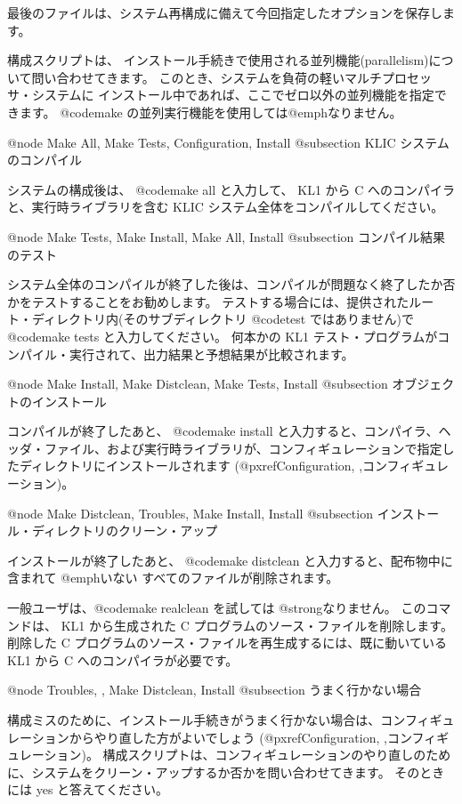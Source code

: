{{{{最後のファイルは、システム再構成に備えて今回指定したオプションを保存します。

構成スクリプトは、
インストール手続きで使用される並列機能(parallelism)について問い合わせてきます。
このとき、システムを負荷の軽いマルチプロセッサ・システムに
インストール中であれば、ここでゼロ以外の並列機能を指定できます。
 @code{make} の並列実行機能を使用しては@emph{なりません}。

@node Make All, Make Tests, Configuration, Install
@subsection KLIC システムのコンパイル

システムの構成後は、 @code{make all} と入力して、 KL1 から C へのコンパイラと、実行時ライブラリを含む KLIC システム全体をコンパイルしてください。

@node Make Tests, Make Install, Make All, Install
@subsection コンパイル結果のテスト

システム全体のコンパイルが終了した後は、コンパイルが問題なく終了したか否かをテストすることをお勧めします。
テストする場合には、提供されたルート・ディレクトリ内(そのサブディレクトリ @code{test} ではありません)で @code{make tests} と入力してください。
何本かの KL1 テスト・プログラムがコンパイル・実行されて、出力結果と予想結果が比較されます。

@node Make Install, Make Distclean, Make Tests, Install
@subsection オブジェクトのインストール

コンパイルが終了したあと、 @code{make install} と入力すると、コンパイラ、ヘッダ・ファイル、および実行時ライブラリが、コンフィギュレーションで指定したディレクトリにインストールされます
(@pxref{Configuration, ,コンフィギュレーション})。

@node Make Distclean, Troubles, Make Install, Install
@subsection インストール・ディレクトリのクリーン・アップ

インストールが終了したあと、 @code{make distclean} と入力すると、配布物中に含まれて @emph{いない} すべてのファイルが削除されます。

一般ユーザは、@code{make realclean} を試しては @strong{なりません}。
このコマンドは、 KL1 から生成された C プログラムのソース・ファイルを削除します。
削除した C プログラムのソース・ファイルを再生成するには、既に動いている KL1 から C へのコンパイラが必要です。

@node Troubles,  , Make Distclean, Install
@subsection うまく行かない場合

構成ミスのために、インストール手続きがうまく行かない場合は、コンフィギュレーションからやり直した方がよいでしょう
(@pxref{Configuration, ,コンフィギュレーション})。
構成スクリプトは、コンフィギュレーションのやり直しのために、システムをクリーン・アップするか否かを問い合わせてきます。
そのときには yes と答えてください。

}}}}
